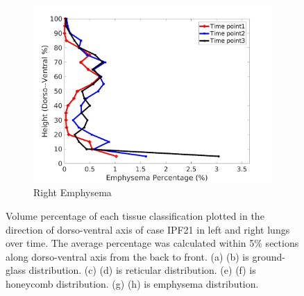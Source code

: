 \begin{figure}[H]
\begin{subfigure}{.42\linewidth}
  \includegraphics[width=\linewidth,trim={{.0\wd0} {.0\wd0} {.0\wd0} {.0\wd0}},clip]{Appendix/Image_AppexA/DorsoToVentral/IPF21RightLungEmphysemaDiseaseDorsoToVentral.jpg}
  \caption{Right Emphysema}
  \label{fig:IPF21DiseaseDorsoToVentral-h}
\end{subfigure}
\caption{Volume percentage of each tissue classification plotted in the direction of dorso-ventral axis of case IPF21 in left and right lungs over time. The average percentage was calculated within 5\% sections along dorso-ventral axis from the back to front. (a) (b) is ground-glass distribution. (c) (d) is reticular distribution. (e) (f) is honeycomb distribution. (g) (h) is emphysema distribution.}
\label{fig:IPF21DiseaseDorsoToVentral}
\end{figure}

